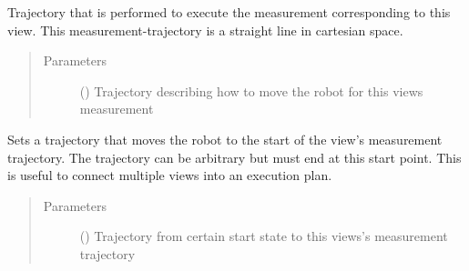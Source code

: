 \documentclass[letterpaper,10pt,english]{sphinxmanual}
\begin{document}
\begin{fulllineitems}
\begin{fulllineitems}
\begin{quote}
\begin{description}
\begin{itemize}
\end{itemize}

\end{description}\end{quote}

\end{fulllineitems}


\begin{fulllineitems}
\label{\detokenize{module_view:agiprobot_measurement.view.View.set_trajectory_for_measurement}}
Trajectory that is performed to execute the measurement corresponding to this view.
This measurement-trajectory is a straight line in cartesian space.
\begin{quote}\begin{description}
\item[{Parameters}] \leavevmode
{} () \textendash{} Trajectory describing how to move the robot for this views measurement

\end{description}\end{quote}

\end{fulllineitems}


\begin{fulllineitems}
\label{\detokenize{module_view:agiprobot_measurement.view.View.set_trajectory_to_view}}
Sets a trajectory that moves the robot to the start of the view’s measurement trajectory.
The trajectory can be arbitrary but must end at this start point. This is useful to connect multiple views into an execution plan.
\begin{quote}\begin{description}
\item[{Parameters}] \leavevmode
{} () \textendash{} Trajectory from certain start state to this views’s measurement trajectory

\end{description}\end{quote}

\end{fulllineitems}


\end{fulllineitems}
\end{document}
